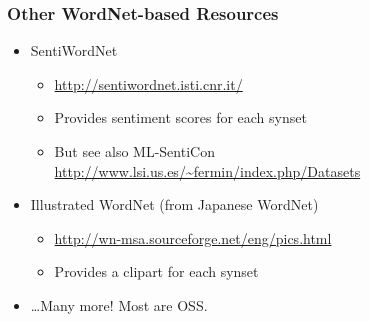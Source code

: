 \begin{frame}
\frametitle{Other WordNet-based Resources}
    
\begin{itemize}[<+->]
\item SentiWordNet \parencite{baccianella2010sentiwordnet}
\begin{itemize}
	\item \url{http://sentiwordnet.isti.cnr.it/}
	\item Provides sentiment scores for each synset
	\item But see also ML-SentiCon \parencite{cruz2014building} \url{http://www.lsi.us.es/~fermin/index.php/Datasets}
\end{itemize}
\item Illustrated WordNet (from Japanese WordNet) \parencite{bond2009enhancing}
	\begin{itemize}
		\item \url{http://wn-msa.sourceforge.net/eng/pics.html}
		\item Provides a clipart for each synset
	\end{itemize}
\item \ldots Many more! Most are OSS.
\end{itemize}

\end{frame}